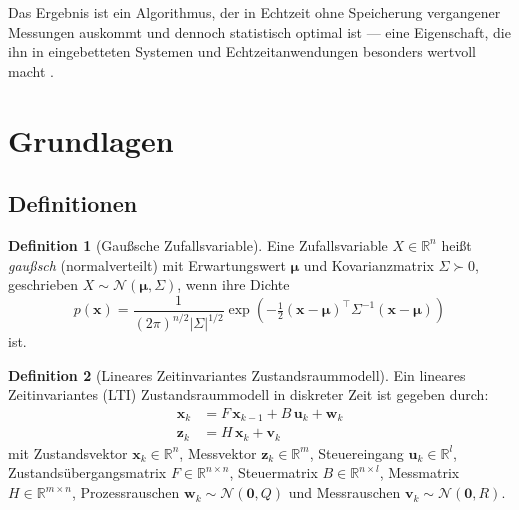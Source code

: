 ﻿\documentclass[a4paper,12pt]{article}
\theoremstyle{definition}
\newtheorem{definition}{Definition}
\begin{document}
Das Ergebnis ist ein Algorithmus, der in Echtzeit ohne Speicherung vergangener Messungen
auskommt und dennoch statistisch optimal ist --- eine Eigenschaft, die ihn in
eingebetteten Systemen und Echtzeitanwendungen besonders wertvoll macht \cite{welch1995,bar2004}.

\section{Grundlagen}

\subsection{Definitionen}

\begin{definition}[Gaußsche Zufallsvariable]
    Eine Zufallsvariable $X \in \mathbb{R}^n$ heißt \emph{gaußsch} (normalverteilt) mit
    Erwartungswert $\boldsymbol{\mu}$ und Kovarianzmatrix $\Sigma \succ 0$, geschrieben
    $X \sim \mathcal{N}(\boldsymbol{\mu}, \Sigma)$, wenn ihre Dichte
    \[
        p(\mathbf{x}) = \frac{1}{(2\pi)^{n/2} |\Sigma|^{1/2}}
        \exp\!\left(-\tfrac{1}{2}(\mathbf{x}-\boldsymbol{\mu})^\top \Sigma^{-1}
        (\mathbf{x}-\boldsymbol{\mu})\right)
    \]
    ist.
\end{definition}

\begin{definition}[Lineares Zeitinvariantes Zustandsraummodell]
\label{def:lti}
    Ein lineares Zeitinvariantes (LTI) Zustandsraummodell in diskreter Zeit ist gegeben durch:
    \begin{align}
        \mathbf{x}_k &= F\,\mathbf{x}_{k-1} + B\,\mathbf{u}_k + \mathbf{w}_k
            \label{eq:proc} \\
        \mathbf{z}_k &= H\,\mathbf{x}_k + \mathbf{v}_k
            \label{eq:meas}
    \end{align}
    mit Zustandsvektor $\mathbf{x}_k \in \mathbb{R}^n$,
    Messvektor $\mathbf{z}_k \in \mathbb{R}^m$,
    Steuereingang $\mathbf{u}_k \in \mathbb{R}^l$,
    Zustandsübergangsmatrix $F \in \mathbb{R}^{n \times n}$,
    Steuermatrix $B \in \mathbb{R}^{n \times l}$,
    Messmatrix $H \in \mathbb{R}^{m \times n}$,
    Prozessrauschen $\mathbf{w}_k \sim \mathcal{N}(\mathbf{0}, Q)$ und
    Messrauschen $\mathbf{v}_k \sim \mathcal{N}(\mathbf{0}, R)$.
\end{definition}
\end{document}
